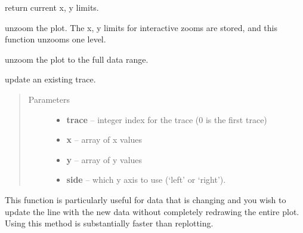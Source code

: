\documentclass[letterpaper,10pt,english]{sphinxmanual}
\begin{document}

\begin{fulllineitems}
\label{plotpanel:get_xylims}
return current x, y limits.

\end{fulllineitems}



\begin{fulllineitems}
\label{plotpanel:unzoom}
unzoom the plot.  The x, y limits for interactive zooms are stored, and this function unzooms one level.

\end{fulllineitems}



\begin{fulllineitems}
\label{plotpanel:unzoom_all}
unzoom the plot to the full data range.

\end{fulllineitems}



\begin{fulllineitems}
\label{plotpanel:update_line}
update an existing trace.
\begin{quote}\begin{description}
\item[{Parameters}] \leavevmode\begin{itemize}
\item {} 
\textbf{trace} -- integer index for the trace (0 is the first trace)

\item {} 
\textbf{x} -- array of x values

\item {} 
\textbf{y} -- array of y values

\item {} 
\textbf{side} -- which y axis to use (`left' or `right').

\end{itemize}

\end{description}\end{quote}

This function is particularly useful for data that is changing and you wish
to update the line with the new data without completely redrawing the entire
plot.  Using this method is substantially faster than replotting.

\end{fulllineitems}
\end{document}
